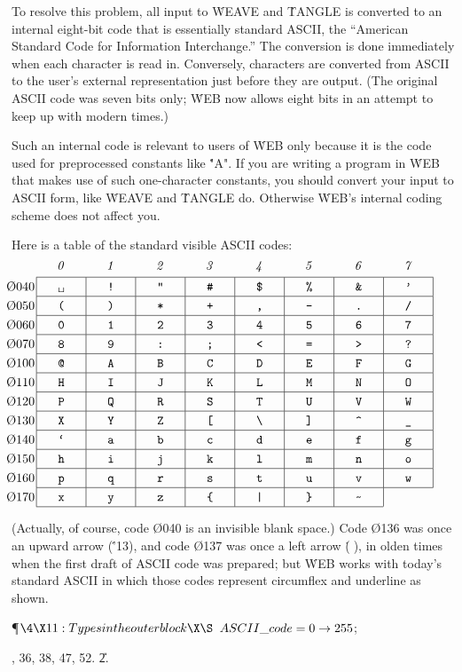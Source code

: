 To resolve this problem, all input to \.{WEAVE} and \.{TANGLE} is
converted to an internal eight-bit code that is essentially standard
ASCII, the ``American Standard Code for Information Interchange.''
The conversion is done immediately when each character is read in.
Conversely, characters are converted from ASCII to the user's external
representation just before they are output. (The original ASCII code
was seven bits only; \.{WEB} now allows eight bits in an attempt to
keep up with modern times.)

Such an internal code is relevant to users of \.{WEB} only because it is
the code used for preprocessed constants like \.{"A"}. If you are writing
a program in \.{WEB} that makes use of such one-character constants, you
should convert your input to ASCII form, like \.{WEAVE} and \.{TANGLE} do.
Otherwise \.{WEB}'s internal coding scheme does not affect you.

Here is a table of the standard visible ASCII codes:
$$\def\:{\char\count255\global\advance\count255 by 1}
\count255='40
\vbox{
\hbox{\hbox to 40pt{\it\hfill0\/\hfill}%
\hbox to 40pt{\it\hfill1\/\hfill}%
\hbox to 40pt{\it\hfill2\/\hfill}%
\hbox to 40pt{\it\hfill3\/\hfill}%
\hbox to 40pt{\it\hfill4\/\hfill}%
\hbox to 40pt{\it\hfill5\/\hfill}%
\hbox to 40pt{\it\hfill6\/\hfill}%
\hbox to 40pt{\it\hfill7\/\hfill}}
\vskip 4pt
\hrule
\def\^{\vrule height 10.5pt depth 4.5pt}
\halign{\hbox to 0pt{\hskip -24pt\O{#0}\hfill}&\^
\hbox to 40pt{\tt\hfill#\hfill\^}&
&\hbox to 40pt{\tt\hfill#\hfill\^}\cr
04&\:&\:&\:&\:&\:&\:&\:&\:\cr\noalign{\hrule}
05&\:&\:&\:&\:&\:&\:&\:&\:\cr\noalign{\hrule}
06&\:&\:&\:&\:&\:&\:&\:&\:\cr\noalign{\hrule}
07&\:&\:&\:&\:&\:&\:&\:&\:\cr\noalign{\hrule}
10&\:&\:&\:&\:&\:&\:&\:&\:\cr\noalign{\hrule}
11&\:&\:&\:&\:&\:&\:&\:&\:\cr\noalign{\hrule}
12&\:&\:&\:&\:&\:&\:&\:&\:\cr\noalign{\hrule}
13&\:&\:&\:&\:&\:&\:&\:&\:\cr\noalign{\hrule}
14&\:&\:&\:&\:&\:&\:&\:&\:\cr\noalign{\hrule}
15&\:&\:&\:&\:&\:&\:&\:&\:\cr\noalign{\hrule}
16&\:&\:&\:&\:&\:&\:&\:&\:\cr\noalign{\hrule}
17&\:&\:&\:&\:&\:&\:&\:\cr}
\hrule width 280pt}$$
(Actually, of course, code \O{040} is an invisible blank space.)  Code \O{136}
was once an upward arrow (\.{\char'13}), and code \O{137} was
once a left arrow (\.^^X), in olden times when the first draft
of ASCII code was prepared; but \.{WEB} works with today's standard
ASCII in which those codes represent circumflex and underline as shown.

\Y\P$\4\X11:Types in the outer block\X\S$\6
$\\{ASCII\_code}=0\to255$;\par
{}, 36, 38, 47, 52.
\U2\*.\fi


